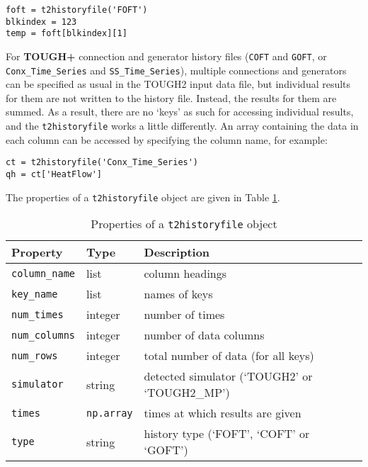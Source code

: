 \begin{lstlisting}
foft = t2historyfile('FOFT')
blkindex = 123
temp = foft[blkindex][1]
\end{lstlisting}

For \textbf{TOUGH+} connection and generator history files (\texttt{COFT} and \texttt{GOFT}, or \texttt{Conx\_Time\_Series} and \texttt{SS\_Time\_Series}), multiple connections and generators can be specified as usual in the TOUGH2 input data file, but individual results for them are not written to the history file.  Instead, the results for them are summed.  As a result, there are no `keys' as such for accessing individual results, and the \texttt{t2historyfile} works a little differently.  An array containing the data in each column can be accessed by specifying the column name, for example:

\begin{lstlisting}
ct = t2historyfile('Conx_Time_Series')
qh = ct['HeatFlow']
\end{lstlisting}

The properties of a \texttt{t2historyfile} object are given in Table \ref{tb:historyfile_properties}.

\begin{table}
  \begin{center}
    \begin{tabular}{|l|l|l|}
      \hline
      \textbf{Property} & \textbf{Type} & \textbf{Description}\\
      \hline
      \texttt{column\_name} & list & column headings\\
      \texttt{key\_name} & list & names of keys\\
      \texttt{num\_times} & integer & number of times\\
      \texttt{num\_columns} & integer & number of data columns\\
      \texttt{num\_rows} & integer & total number of data (for all keys)\\
      \texttt{simulator} & string & detected simulator (`TOUGH2' or `TOUGH2\_MP')\\
      \texttt{times} & \texttt{np.array} & times at which results are given\\
      \texttt{type} & string & history type (`FOFT', `COFT' or `GOFT')\\
      \hline
    \end{tabular}
    \caption{Properties of a \texttt{t2historyfile} object}
    \label{tb:historyfile_properties}
  \end{center}
\end{table}

